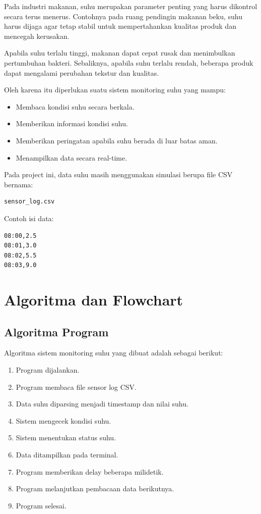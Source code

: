 \documentclass[a4paper,12pt]{article}
\begin{document}
Pada industri makanan, suhu merupakan parameter penting yang harus dikontrol secara terus menerus. Contohnya pada ruang pendingin makanan beku, suhu harus dijaga agar tetap stabil untuk mempertahankan kualitas produk dan mencegah kerusakan.

Apabila suhu terlalu tinggi, makanan dapat cepat rusak dan menimbulkan pertumbuhan bakteri. Sebaliknya, apabila suhu terlalu rendah, beberapa produk dapat mengalami perubahan tekstur dan kualitas.

Oleh karena itu diperlukan suatu sistem monitoring suhu yang mampu:

\begin{itemize}
    \item Membaca kondisi suhu secara berkala.
    \item Memberikan informasi kondisi suhu.
    \item Memberikan peringatan apabila suhu berada di luar batas aman.
    \item Menampilkan data secara real-time.
\end{itemize}

Pada project ini, data suhu masih menggunakan simulasi berupa file CSV bernama:

\begin{verbatim}
sensor_log.csv
\end{verbatim}

Contoh isi data:

\begin{verbatim}
08:00,2.5
08:01,3.0
08:02,5.5
08:03,9.0
\end{verbatim}


\section{Algoritma dan Flowchart}

\subsection{Algoritma Program}

Algoritma sistem monitoring suhu yang dibuat adalah sebagai berikut:

\begin{enumerate}
    \item Program dijalankan.
    \item Program membaca file sensor log CSV.
    \item Data suhu diparsing menjadi timestamp dan nilai suhu.
    \item Sistem mengecek kondisi suhu.
    \item Sistem menentukan status suhu.
    \item Data ditampilkan pada terminal.
    \item Program memberikan delay beberapa milidetik.
    \item Program melanjutkan pembacaan data berikutnya.
    \item Program selesai.
\end{enumerate}
\end{document}
